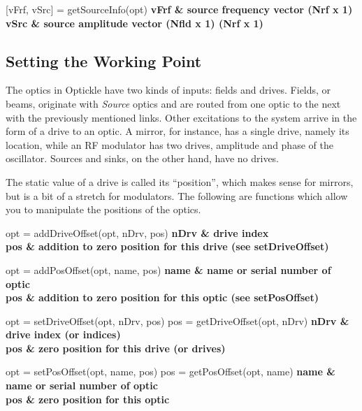 \documentclass[12pt]{article}
\begin{document}
\begin{funcinfo}{[vFrf, vSrc] = getSourceInfo(opt)}
  \bf{vFrf} & source frequency vector (Nrf x 1)\\
  \bf{vSrc} & source amplitude vector (Nfld x 1) (Nrf x 1)\\
\end{funcinfo}

\subsection{Setting the Working Point}

The optics in Optickle have two kinds of inputs: fields and drives.
Fields, or beams, originate with {\it Source} optics and are routed from one optic to the next with the previously mentioned links.
Other excitations to the system arrive in the form of a drive to an optic.
A mirror, for instance, has a single drive, namely its location, while an RF modulator has two drives, amplitude and phase of the oscillator.
Sources and sinks, on the other hand, have no drives.

The static value of a drive is called its ``position'', which makes sense for mirrors, but is a bit of a stretch for modulators.
The following are functions which allow you to manipulate the positions of the optics.

\begin{funcinfo}{opt = addDriveOffset(opt, nDrv, pos)}
  \bf nDrv & drive index\\
  \bf pos & addition to zero position for this drive (see setDriveOffset)\\
\end{funcinfo}

\begin{funcinfo}{opt = addPosOffset(opt, name, pos)}
  \bf name & name or serial number of optic\\
  \bf pos & addition to zero position for this optic (see setPosOffset)\\
\end{funcinfo}

\begin{funcinfo2}
  {opt = setDriveOffset(opt, nDrv, pos)}
  {pos = getDriveOffset(opt, nDrv)}
  \bf nDrv & drive index (or indices)\\
  \bf pos & zero position for this drive (or drives)\\
\end{funcinfo2}

\begin{funcinfo2}
  {opt = setPosOffset(opt, name, pos)}
  {pos = getPosOffset(opt, name)}
  \bf name & name or serial number of optic\\
  \bf pos & zero position for this optic\\
\end{funcinfo2}
\end{document}
